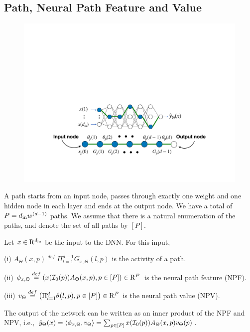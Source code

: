 \subsection{Path, Neural Path Feature and Value}
\FloatBarrier
\begin{figure}[h]
\centering
\includegraphics[scale=0.32]{figs/paths.pdf}
\end{figure}
A path starts from an input node, passes through exactly one weight and one hidden node in each layer and ends at the output node. We have a total of $P=d_{\text{in}} w^{(d-1)}$ paths. We assume that there is a natural enumeration of the paths, and denote the set of all paths by $[P]$.
\begin{definition}\label{def:nps} Let $x\in\mathrm{R}^{d_{\text{in}}}$ be the input to the DNN. For this input, 

(i)  $A_{\Theta}(x,p)\stackrel{def}{=}\Pi_{l=1}^{d-1} G_{x,\Theta}(l,p)$ is the activity of a path.

(ii)  $\phi_{x,\Theta}\stackrel{def}=\left(x(\mathcal{I}_0(p))A_{\Theta}(x,p) ,p\in[P]\right)\in\mathrm{R}^P$ is the {neural path feature} (NPF).

(iii)  $v_{\Theta}\stackrel{def}=\left(\Pi_{l=1}^d \theta(l,p),p\in[P]\right)\in\mathrm{R}^P$ is the {neural path value} (NPV).
\end{definition}
\begin{proposition}\label{prop:zero}  The output of the network can be written as an inner product of the NPF and NPV, i.e., 
$\hat{y}_{\Theta}(x)=\langle \phi_{x,\Theta},v_{\Theta}\rangle=\sum_{p\in [P]}x(\mathcal{I}_0(p))A_{\Theta}(x,p)v_{\Theta}(p)$.
\end{proposition}

